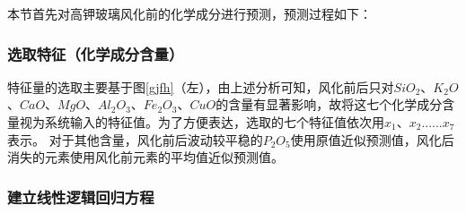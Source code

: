 \documentclass[withoutpreface,bwprint]{cumcmthesis} %
\begin{document}
本节首先对高钾玻璃风化前的化学成分进行预测，预测过程如下：

\subsubsection{选取特征（化学成分含量）}

特征量的选取主要基于图\ref{gjfh}（左），由上述分析可知，风化前后只对$SiO_{2}$、$K_{2}O$、$CaO$、$MgO$、$Al_{2}O_{3}$、$Fe_{2}O_{3}$、$CuO$的含量有显著影响，故将这七个化学成分含量视为系统输入的特征值。为了方便表达，选取的七个特征值依次用$x_{1}$、$x_{2}$......$x_{7}$表示。 对于其他含量，风化前后波动较平稳的$P_{2}O_{5}$使用原值近似预测值，风化后消失的元素使用风化前元素的平均值近似预测值。


\subsubsection{建立线性逻辑回归方程}
\end{document}
